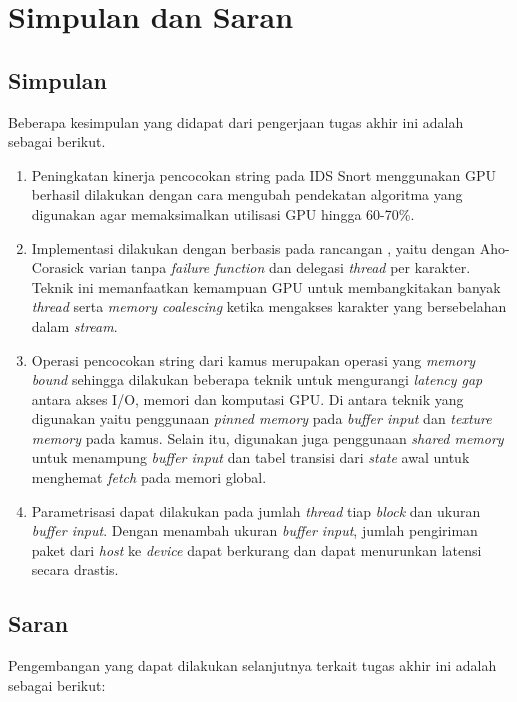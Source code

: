 \chapter{Simpulan dan Saran}

\section{Simpulan}
    Beberapa kesimpulan yang didapat dari pengerjaan tugas akhir ini adalah sebagai berikut.

    \begin{enumerate}

        \item 
        Peningkatan kinerja pencocokan string pada IDS Snort menggunakan GPU berhasil dilakukan dengan cara mengubah pendekatan algoritma yang digunakan agar memaksimalkan utilisasi GPU hingga 60-70\%.

        \item
        Implementasi dilakukan dengan berbasis pada rancangan \cite{lin2013}, yaitu dengan Aho-Corasick varian tanpa \emph{failure function} dan delegasi \emph{thread} per karakter. Teknik ini memanfaatkan kemampuan GPU untuk membangkitakan banyak \emph{thread} serta \emph{memory coalescing} ketika mengakses karakter yang bersebelahan dalam \emph{stream}.
        
        \item 
        Operasi pencocokan string dari kamus merupakan operasi yang \emph{memory bound} sehingga dilakukan beberapa teknik untuk mengurangi \emph{latency gap} antara akses I/O, memori dan komputasi GPU. Di antara teknik yang digunakan yaitu penggunaan \emph{pinned memory} pada \emph{buffer input} dan \emph{texture memory} pada kamus. Selain itu, digunakan juga penggunaan \emph{shared memory} untuk menampung \emph{buffer input} dan tabel transisi dari \emph{state} awal untuk menghemat \emph{fetch} pada memori global.

        \item
        Parametrisasi dapat dilakukan pada jumlah \emph{thread} tiap \emph{block} dan ukuran \emph{buffer input}. Dengan menambah ukuran \emph{buffer input}, jumlah pengiriman paket dari \emph{host} ke \emph{device} dapat berkurang dan dapat menurunkan latensi secara drastis.
        
    \end{enumerate}\clearpage

\section{Saran}
    Pengembangan yang dapat dilakukan selanjutnya terkait tugas akhir ini adalah sebagai berikut:

